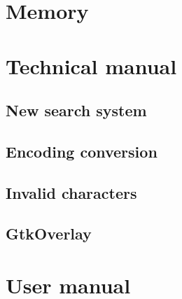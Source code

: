 \documentclass[a4paper,11pt,twoside]{book}
\begin{document}
\part{Memory}













\part{Technical manual}






\chapter{New search system}
\chapter{Encoding conversion}
\chapter{Invalid characters}
\chapter{GtkOverlay}

\part{User manual}



\appendix







\nocite{*}


\end{document}
